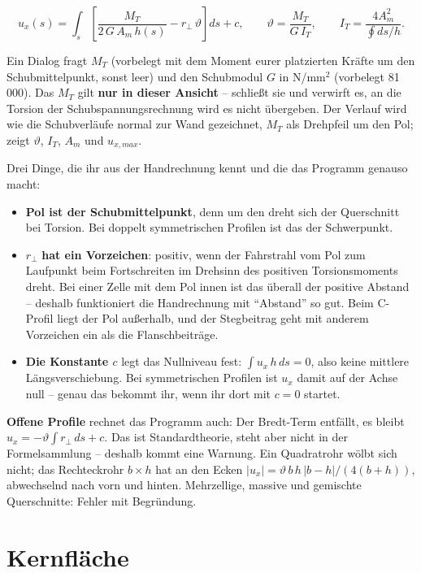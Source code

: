 \[
  u_x(s) = \int_s \left[ \frac{M_T}{2\,G\,A_m\,h(s)} - r_\perp\,\vartheta \right] ds + c,
  \qquad \vartheta = \frac{M_T}{G\,I_T}, \qquad I_T = \frac{4A_m^2}{\oint ds/h}.
\]

Ein Dialog fragt $M_T$ (vorbelegt mit dem Moment eurer platzierten Kräfte um den
Schubmittelpunkt, sonst leer) und den Schubmodul $G$ in N/mm$^2$ (vorbelegt 81\,000). Das
$M_T$ gilt \textbf{nur in dieser Ansicht} --  schließt sie und verwirft es, an die
Torsion der Schubspannungsrechnung wird es nicht übergeben. Der Verlauf wird wie die
Schubverläufe normal zur Wand gezeichnet, $M_T$ als Drehpfeil um den Pol;  zeigt
$\vartheta$, $I_T$, $A_m$ und $u_{x,max}$.

Drei Dinge, die ihr aus der Handrechnung kennt und die das Programm genauso macht:

\begin{itemize}
  \item \textbf{Pol ist der Schubmittelpunkt}, denn um den dreht sich der Querschnitt bei
        Torsion. Bei doppelt symmetrischen Profilen ist das der Schwerpunkt.
  \item $r_\perp$ \textbf{hat ein Vorzeichen}: positiv, wenn der Fahrstrahl vom Pol zum
        Laufpunkt beim Fortschreiten im Drehsinn des positiven Torsionsmoments dreht. Bei einer
        Zelle mit dem Pol innen ist das überall der positive Abstand -- deshalb funktioniert die
        Handrechnung mit \enquote{Abstand} so gut. Beim C-Profil liegt der Pol außerhalb, und der
        Stegbeitrag geht mit anderem Vorzeichen ein als die Flanschbeiträge.
  \item \textbf{Die Konstante $c$} legt das Nullniveau fest: $\int u_x\,h\,ds = 0$, also keine
        mittlere Längsverschiebung. Bei symmetrischen Profilen ist $u_x$ damit auf der Achse null
        -- genau das bekommt ihr, wenn ihr dort mit $c = 0$ startet.
\end{itemize}

\textbf{Offene Profile} rechnet das Programm auch: Der Bredt-Term entfällt, es bleibt
$u_x = -\vartheta \int r_\perp\,ds + c$. Das ist Standardtheorie, steht aber nicht in der
Formelsammlung -- deshalb kommt eine Warnung. Ein Quadratrohr wölbt sich nicht; das Rechteckrohr
$b \times h$ hat an den Ecken $|u_x| = \vartheta\,b\,h\,|b-h|/(4(b+h))$, abwechselnd nach vorn und
hinten. Mehrzellige, massive und gemischte Querschnitte: Fehler mit Begründung.

\section{Kernfläche}

